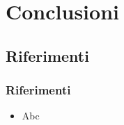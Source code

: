 \section*{Conclusioni}
\subsection*{Riferimenti}
\begin{frame}
  \frametitle{Riferimenti}

  \begin{itemize}
   \item Abc
  \end{itemize}

\end{frame}
